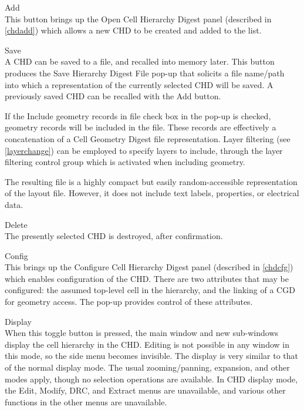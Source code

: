 \begin{description}
\item{\cb Add}\\
This button brings up the {\cb Open Cell Hierarchy Digest} panel
(described in \ref{chdadd}) which allows a new CHD to be created and
added to the list.

\item{\cb Save}\\
A CHD can be saved to a file, and recalled into memory later.  This
button produces the {\cb Save Hierarchy Digest File} pop-up that
solicits a file name/path into which a representation of the currently
selected CHD will be saved.  A previously saved CHD can be recalled
with the {\cb Add} button.

If the {\cb Include geometry records in file} check box in the pop-up
is checked, geometry records will be included in the file.  These
records are effectively a concatenation of a Cell Geometry Digest file
representation.  Layer filtering (see \ref{layerchange}) can be
employed to specify layers to include, through the layer filtering
control group which is activated when including geometry.

The resulting file is a highly compact but easily random-accessible
representation of the layout file.  However, it does not include text
labels, properties, or electrical data.

\item{\cb Delete}\\
The presently selected CHD is destroyed, after confirmation.

\item{\cb Config}\\
This brings up the {\cb Configure Cell Hierarchy Digest} panel
(described in \ref{chdcfg}) which enables configuration of the CHD. 
There are two attributes that may be configured:  the assumed
top-level cell in the hierarchy, and the linking of a CGD for geometry
access.  The pop-up provides control of these attributes.

\item{\cb Display}\\
When this toggle button is pressed, the main window and new sub-windows
display the cell hierarchy in the CHD.  Editing is not possible in any
window in this mode, so the side menu becomes invisible.  The display
is very similar to that of the normal display mode.  The usual
zooming/panning, expansion, and other modes apply, though no selection
operations are available.  In CHD display mode, the {\cb Edit}, {\cb
Modify}, {\cb DRC}, and {\cb Extract} menus are unavailable, and
various other functions in the other menus are unavailable.


\end{description}
